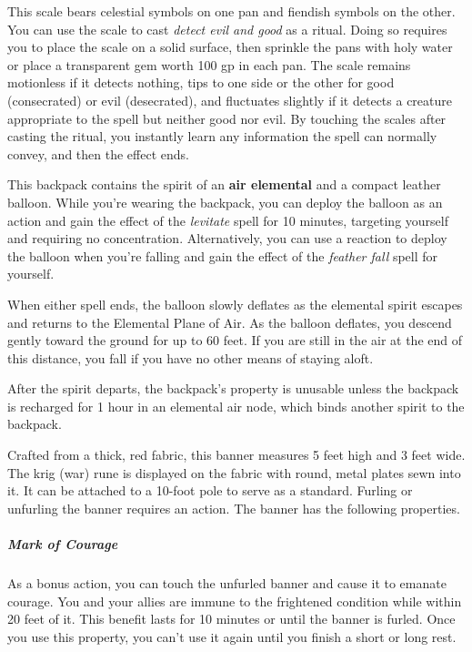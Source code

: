 \documentclass[10pt,a4paper,twoside,bg=print,twocolumn,openany,nodeprecatedcode]{dndbook}
\begin{document}
This scale bears celestial symbols on one pan and fiendish symbols on the other. You can use the scale to cast \textit{detect evil and good} as a ritual. Doing so requires you to place the scale on a solid surface, then sprinkle the pans with holy water or place a transparent gem worth 100 gp in each pan. The scale remains motionless if it detects nothing, tips to one side or the other for good (consecrated) or evil (desecrated), and fluctuates slightly if it detects a creature appropriate to the spell but neither good nor evil. By touching the scales after casting the ritual, you instantly learn any information the spell can normally convey, and then the effect ends.

This backpack contains the spirit of an \textbf{air elemental} and a compact leather balloon. While you're wearing the backpack, you can deploy the balloon as an action and gain the effect of the \textit{levitate} spell for 10 minutes, targeting yourself and requiring no concentration. Alternatively, you can use a reaction to deploy the balloon when you're falling and gain the effect of the \textit{feather fall} spell for yourself.

When either spell ends, the balloon slowly deflates as the elemental spirit escapes and returns to the Elemental Plane of Air. As the balloon deflates, you descend gently toward the ground for up to 60 feet. If you are still in the air at the end of this distance, you fall if you have no other means of staying aloft.

After the spirit departs, the backpack's property is unusable unless the backpack is recharged for 1 hour in an elemental air node, which binds another spirit to the backpack.

Crafted from a thick, red fabric, this banner measures 5 feet high and 3 feet wide. The krig (war) rune is displayed on the fabric with round, metal plates sewn into it. It can be attached to a 10-foot pole to serve as a standard. Furling or unfurling the banner requires an action. The banner has the following properties.

\subparagraph{Mark of Courage}
As a bonus action, you can touch the unfurled banner and cause it to emanate courage. You and your allies are immune to the frightened condition while within 20 feet of it. This benefit lasts for 10 minutes or until the banner is furled. Once you use this property, you can't use it again until you finish a short or long rest.
\end{document}
